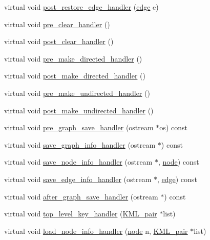 \begin{DoxyCompactItemize}
\item 
virtual void \mbox{\hyperlink{classgraph_a8c0f68bcd054fc2736716996bbf56472}{post\+\_\+restore\+\_\+edge\+\_\+handler}} (\mbox{\hyperlink{classedge}{edge}} e)
\item 
virtual void \mbox{\hyperlink{classgraph_a16ccad78837d16be59854549cd2d847a}{pre\+\_\+clear\+\_\+handler}} ()
\item 
virtual void \mbox{\hyperlink{classgraph_a870633528590b7925cd27776bdd2bbd2}{post\+\_\+clear\+\_\+handler}} ()
\item 
virtual void \mbox{\hyperlink{classgraph_a505198f412b1e426e9d09b62ea9811e8}{pre\+\_\+make\+\_\+directed\+\_\+handler}} ()
\item 
virtual void \mbox{\hyperlink{classgraph_a43dc35def3d8125eb8f3841d55e0b1c8}{post\+\_\+make\+\_\+directed\+\_\+handler}} ()
\item 
virtual void \mbox{\hyperlink{classgraph_a8964107991e6f411ba8992f6b1deda21}{pre\+\_\+make\+\_\+undirected\+\_\+handler}} ()
\item 
virtual void \mbox{\hyperlink{classgraph_a3d2bc348d12931aff1d2e97a6b4285c3}{post\+\_\+make\+\_\+undirected\+\_\+handler}} ()
\item 
virtual void \mbox{\hyperlink{classgraph_ab4bf5526925f52aa6967a563b4abbd97}{pre\+\_\+graph\+\_\+save\+\_\+handler}} (ostream $\ast$os) const
\item 
virtual void \mbox{\hyperlink{classgraph_a09d33566f9444f6aabab5c2238aaf760}{save\+\_\+graph\+\_\+info\+\_\+handler}} (ostream $\ast$) const
\item 
virtual void \mbox{\hyperlink{classgraph_a9c7286899f32db62873b8242e90051d7}{save\+\_\+node\+\_\+info\+\_\+handler}} (ostream $\ast$, \mbox{\hyperlink{classnode}{node}}) const
\item 
virtual void \mbox{\hyperlink{classgraph_ad66769013784410f3ff54aac579350b5}{save\+\_\+edge\+\_\+info\+\_\+handler}} (ostream $\ast$, \mbox{\hyperlink{classedge}{edge}}) const
\item 
virtual void \mbox{\hyperlink{classgraph_a4278e47ede82977ee051e88950e5cc6a}{after\+\_\+graph\+\_\+save\+\_\+handler}} (ostream $\ast$) const
\item 
virtual void \mbox{\hyperlink{classgraph_aaac6dc28cddaf9fbff20ddb4228dad9a}{top\+\_\+level\+\_\+key\+\_\+handler}} (\mbox{\hyperlink{struct_k_m_l__pair}{K\+M\+L\+\_\+pair}} $\ast$list)
\item 
virtual void \mbox{\hyperlink{classgraph_a1844866137c51123b05f21be60e1e165}{load\+\_\+node\+\_\+info\+\_\+handler}} (\mbox{\hyperlink{classnode}{node}} n, \mbox{\hyperlink{struct_k_m_l__pair}{K\+M\+L\+\_\+pair}} $\ast$list)

\end{DoxyCompactItemize}
